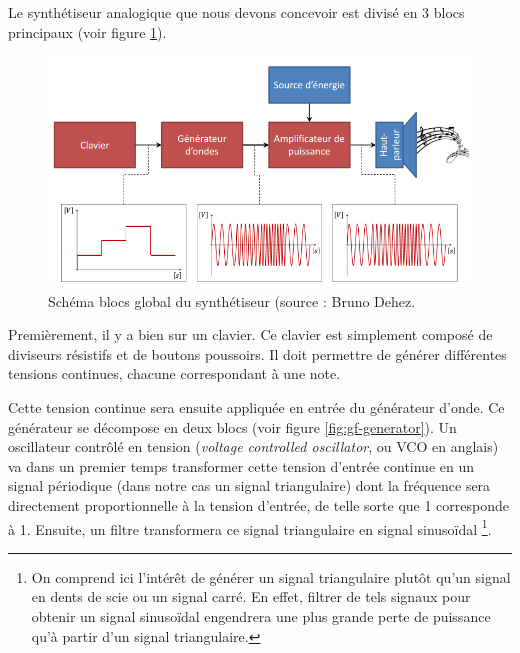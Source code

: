 

Le synthétiseur analogique que nous devons concevoir
est divisé en 3 blocs principaux (voir figure \ref{fig:gf-global}).

\begin{figure}[ht]
	\centering
	\includegraphics[scale=0.6]{img-gf/gf-global.png}
	\caption{Schéma blocs global du synthétiseur (source : Bruno Dehez.}
	\label{fig:gf-global}
\end{figure}

Premièrement, il y a bien sur un clavier. Ce clavier est simplement
composé de diviseurs résistifs et de boutons poussoirs. Il doit
permettre de générer différentes tensions continues, chacune
correspondant à une note.

Cette tension continue sera ensuite appliquée en entrée du générateur
d'onde. Ce générateur se décompose en deux blocs (voir figure
\ref{fig:gf-generator}). Un oscillateur contrôlé en tension 
(\textit{voltage controlled oscillator}, ou VCO en anglais) va dans
un premier temps transformer cette tension d'entrée continue
en un signal périodique (dans notre cas un signal triangulaire) 
dont la fréquence sera directement proportionnelle
à la tension d'entrée, de telle sorte que
\unit{1}{\milli\volt} corresponde à \unit{1}{\hertz}. Ensuite, un filtre
transformera ce signal triangulaire en signal sinusoïdal
\footnote{On comprend ici l'intérêt de générer un signal triangulaire plutôt
qu'un signal en dents de scie ou un signal carré. En effet, filtrer
de tels signaux pour obtenir un signal sinusoïdal engendrera
une plus grande perte de puissance qu'à partir d'un signal
triangulaire.}.

